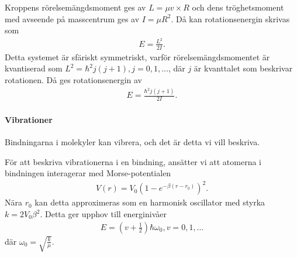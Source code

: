 Kroppens rörelsemängdsmoment ges av $L = \mu v\times R$ och dens tröghetsmoment med avseende på masscentrum ges av $I = \mu R^{2}$. Då kan rotationsenergin skrivas som
\begin{align*}
	E = \frac{L^{2}}{2I}.
\end{align*}
Detta systemet är sfäriskt symmetriskt, varför rörelsemängdsmomentet är kvantiserad som $L^{2} = \hbar^{2}j(j + 1), j = 0, 1, \dots$, där $j$ är kvanttalet som beskrivar rotationen. Då ges rotationsenergin av
\begin{align*}
	E = \frac{\hbar^{2}j(j + 1)}{2I}.
\end{align*}

\paragraph{Vibrationer}
Bindningarna i molekyler kan vibrera, och det är detta vi vill beskriva.

För att beskriva vibrationerna i en bindning, ansätter vi att atomerna i bindningen interagerar med Morse-potentialen
\begin{align*}
	V(r) = V_{0}\left(1 - e^{-\beta(r - r_{0})}\right)^{2}.
\end{align*}
Nära $r_{0}$ kan detta approximeras som en harmonisk oscillator med styrka $k = 2V_{0}\beta^{2}$. Detta ger upphov till energinivåer
\begin{align*}
	E = (v + \frac{1}{2})\hbar\omega_{0}, v = 0, 1, \dots
\end{align*}
där $\omega_{0} = \sqrt{\frac{k}{\mu}}$.